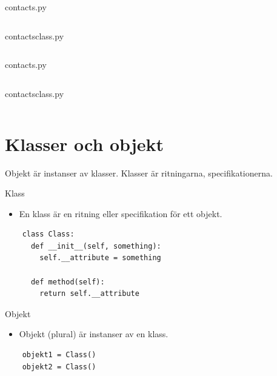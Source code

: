 \begin{frame}[fragile]
  contacts.py \hrulefill
  \inputminted[linenos,firstline=3,lastline=9]{python}{examples/contacts.py}
  \vfill
  contacts\textunderscore{}class.py \hrulefill
  \inputminted[linenos,firstline=3,lastline=9]{python}{examples/contacts_class.py}
\end{frame}

\begin{frame}[fragile]
  contacts.py \hrulefill
  \inputminted[linenos,firstline=25,lastline=35]{python}{examples/contacts.py}
  \vfill
  contacts\textunderscore{}class.py \hrulefill
  \inputminted[linenos,firstline=23,lastline=25]{python}{examples/contacts_class.py}
\end{frame}



\section{Klasser och objekt}

Objekt är instanser av klasser.
Klasser är ritningarna, specifikationerna.

\begin{frame}[fragile]
  \begin{block}{Klass}
    \begin{itemize}
      \item En klass är en ritning eller specifikation för ett objekt.
    \end{itemize}
  \end{block}

  \begin{verbatim}
    class Class:
      def __init__(self, something):
        self.__attribute = something

      def method(self):
        return self.__attribute
  \end{verbatim}
\end{frame}

\begin{frame}[fragile]
  \begin{block}{Objekt}
    \begin{itemize}
      \item Objekt (plural) är instanser av en klass.
    \end{itemize}
  \end{block}

  \begin{verbatim}
    objekt1 = Class()
    objekt2 = Class()
  \end{verbatim}
\end{frame}


